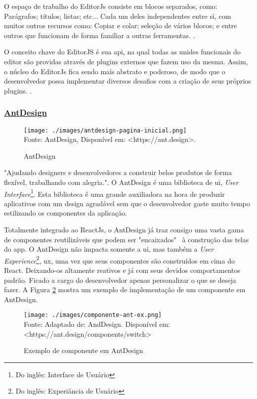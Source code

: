 O espaço de trabalho do EditorJs consiste em blocos separados, como:
Parágrafos; títulos; listas; etc... Cada um deles independentes entre si,
com muitos outros recursos como: Copiar e colar; seleção de vários blocos;
e entre outros que funcionam de forma familiar a outras ferramentas.
\cite{editorjs}.

O conceito chave do EditorJS é sua \acrshort{api}, na qual
todas as unides funcionais do editor são providas através de plugins externos que fazem
uso da mesma. Assim, o núcleo do EditorJs fica sendo mais abstrato e poderoso, de
modo que o desenvolvedor possa implementar diversos desafios com a criação
de seus próprios plugins.
\cite{editorjs}.

\subsubsection{\underline{AntDesign}}

\begin{figure}[H]
    \centering
    \caption{AntDesign}
    \texttt{[image: ./images/antdesign-pagina-inicial.png]}
    \label{fig:antdesign-pagina-inicial} \\
    \textnormal{\fontsize{10pt}{12pt}Fonte: AntDesign, Disponível em: <https://ant.design>.}
\end{figure}

"Ajudando designers e desenvolvedores a construir belos produtos de forma flexível, trabalhando com alegria.".
O AntDesign é uma biblioteca de
\acrshort{ui},
\textit{User Interface}\footnote{Do inglês: Interface de Usuário
}.
Esta biblioteca é uma grande auxiliadora na hora de produzir aplicativos
com um design agradável sem que o desenvolvedor gaste muito tempo
estilizando os componentes da aplicação.

Totalmente integrado ao ReactJs, o AntDesign já traz consigo uma vasta
gama de componentes reutilizáveis que podem ser "encaixados"~ à
construção das telas do app.
O AntDesign não impacta somente a
\acrshort{ui},
mas também a
\textit{User Experience}\footnote{Do inglês: Experiância de Usuário
},
\acrshort{ux}, uma vez que seus componentes são construídos
em cima do React. Deixando-os altamente reativos e já com seus
devidos comportamentos padrão. Ficado a cargo do desenvolvedor
apenas personalizar o que se deseja fazer.
A
Figura \ref{fig:componente-ant-ex}
mostra um exemplo de implementação de um componente em AntDesign.

\begin{figure}[H]
    \centering
    \caption{Exemplo de componente em AntDesign}
    \texttt{[image: ./images/componente-ant-ex.png]}
    \label{fig:componente-ant-ex} \\
    \textnormal{\fontsize{10pt}{12pt}Fonte: Adaptado de: AndDesign. Disponível em: <https://ant.design/components/switch>}
\end{figure}


